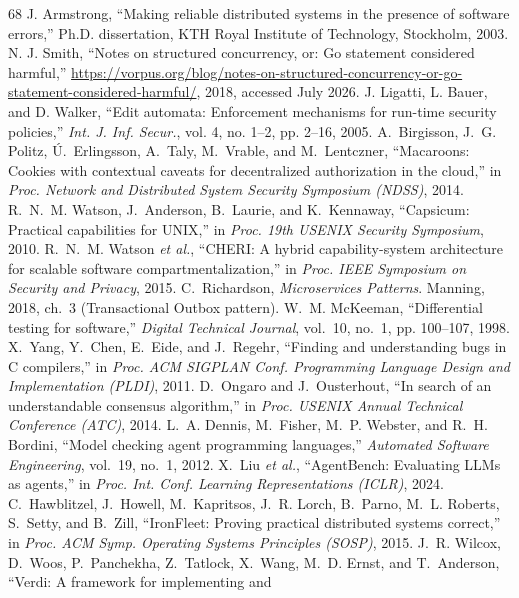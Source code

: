 \documentclass[10pt,journal,compsoc]{IEEEtran}
\begin{document}
\begin{thebibliography}{68}
 J. Armstrong, ``Making reliable distributed systems in
the presence of software errors,'' Ph.D. dissertation, KTH Royal Institute
of Technology, Stockholm, 2003.
 N. J. Smith, ``Notes on structured concurrency, or: Go
statement considered harmful,''
\url{https://vorpus.org/blog/notes-on-structured-concurrency-or-go-statement-considered-harmful/},
2018, accessed July 2026.
 J. Ligatti, L. Bauer, and D. Walker, ``Edit automata:
Enforcement mechanisms for run-time security policies,'' \emph{Int. J. Inf.
Secur.}, vol. 4, no. 1--2, pp. 2--16, 2005.
 A.~Birgisson, J.~G. Politz, {\'U}.~Erlingsson, A.~Taly,
M.~Vrable, and M.~Lentczner, ``Macaroons: Cookies with contextual caveats for
decentralized authorization in the cloud,'' in \emph{Proc. Network and
Distributed System Security Symposium (NDSS)}, 2014.
 R.~N.~M. Watson, J.~Anderson, B.~Laurie, and K.~Kennaway,
``Capsicum: Practical capabilities for UNIX,'' in \emph{Proc. 19th USENIX
Security Symposium}, 2010.
 R.~N.~M. Watson \emph{et al.}, ``CHERI: A hybrid
capability-system architecture for scalable software compartmentalization,''
in \emph{Proc. IEEE Symposium on Security and Privacy}, 2015.
 C.~Richardson, \emph{Microservices Patterns}. Manning,
2018, ch.~3 (Transactional Outbox pattern).
 W.~M. McKeeman, ``Differential testing for software,''
\emph{Digital Technical Journal}, vol.~10, no.~1, pp. 100--107, 1998.
 X.~Yang, Y.~Chen, E.~Eide, and J.~Regehr, ``Finding and
understanding bugs in C compilers,'' in \emph{Proc. ACM SIGPLAN Conf.
Programming Language Design and Implementation (PLDI)}, 2011.
 D.~Ongaro and J.~Ousterhout, ``In search of an
understandable consensus algorithm,'' in \emph{Proc. USENIX Annual
Technical Conference (ATC)}, 2014.
 L.~A. Dennis, M.~Fisher, M.~P. Webster, and R.~H. Bordini,
``Model checking agent programming languages,'' \emph{Automated Software
Engineering}, vol.~19, no.~1, 2012.
 X.~Liu \emph{et al.}, ``AgentBench: Evaluating LLMs
as agents,'' in \emph{Proc. Int. Conf. Learning Representations (ICLR)},
2024.
 C.~Hawblitzel, J.~Howell, M.~Kapritsos, J.~R. Lorch,
B.~Parno, M.~L. Roberts, S.~Setty, and B.~Zill, ``IronFleet: Proving
practical distributed systems correct,'' in \emph{Proc. ACM Symp. Operating
Systems Principles (SOSP)}, 2015.
 J.~R. Wilcox, D.~Woos, P.~Panchekha, Z.~Tatlock, X.~Wang,
M.~D. Ernst, and T.~Anderson, ``Verdi: A framework for implementing and

\end{thebibliography}
\end{document}
